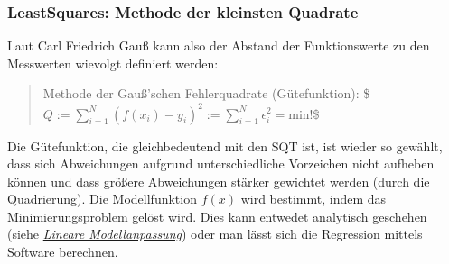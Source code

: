 \documentclass[letterpaper,10pt,english]{jupyterBook}
\begin{document}
\sphinxAtStartPar
{}


\subsubsection{Least\sphinxhyphen{}Squares: Methode der kleinsten Quadrate }
\label{\detokenize{content/1_Kurvenanpassung:least-squares-methode-der-kleinsten-quadrate-a-id-subsec-least-squares-a}}
\sphinxAtStartPar
Laut Carl Friedrich Gauß kann also der Abstand der Funktionswerte zu den Messwerten wievolgt definiert werden:
\begin{quote}

\sphinxAtStartPar
Methode der Gauß’schen Fehlerquadrate (Gütefunktion):
\$\(Q := \sum_{i=1}^N \left( f(x_i) - y_i\right)^2 :=  \sum_{i=1}^N \epsilon_i^2 = \mathrm{min!}\)\$
\end{quote}

\sphinxAtStartPar
Die Gütefunktion, die gleichbedeutend mit den SQT ist, ist wieder so gewählt, dass sich Abweichungen aufgrund unterschiedliche Vorzeichen nicht aufheben können und dass größere Abweichungen stärker gewichtet werden (durch die Quadrierung). Die Modellfunktion \(f(x)\) wird bestimmt, indem das Minimierungsproblem gelöst wird. Dies kann entwedet analytisch geschehen (siehe {\hyperref[\detokenize{content/1_Kurvenanpassung:SubSec-Lineare_Modellanpassung}]{\emph{Lineare Modellanpassung}}}) oder man lässt sich die Regression mittels Software berechnen.
\end{document}
